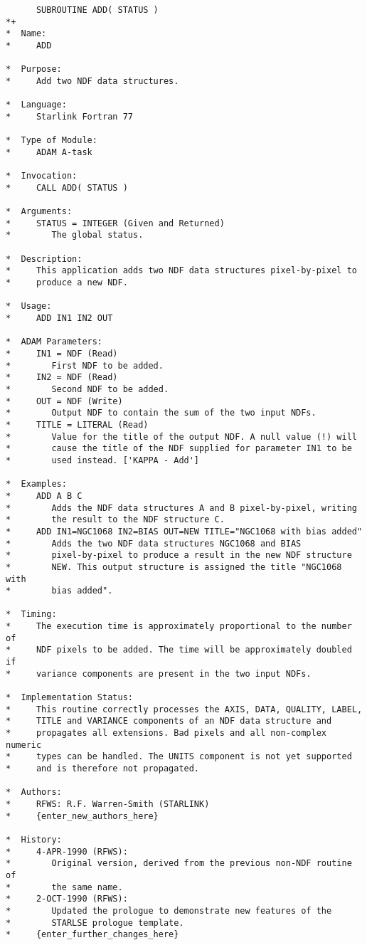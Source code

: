 \small
\begin{verbatim}
      SUBROUTINE ADD( STATUS )
*+
*  Name:
*     ADD

*  Purpose:
*     Add two NDF data structures.

*  Language:
*     Starlink Fortran 77

*  Type of Module:
*     ADAM A-task

*  Invocation:
*     CALL ADD( STATUS )

*  Arguments:
*     STATUS = INTEGER (Given and Returned)
*        The global status.

*  Description:
*     This application adds two NDF data structures pixel-by-pixel to
*     produce a new NDF.

*  Usage:
*     ADD IN1 IN2 OUT

*  ADAM Parameters:
*     IN1 = NDF (Read)
*        First NDF to be added.
*     IN2 = NDF (Read)
*        Second NDF to be added.
*     OUT = NDF (Write)
*        Output NDF to contain the sum of the two input NDFs.
*     TITLE = LITERAL (Read)
*        Value for the title of the output NDF. A null value (!) will
*        cause the title of the NDF supplied for parameter IN1 to be
*        used instead. ['KAPPA - Add']

*  Examples:
*     ADD A B C
*        Adds the NDF data structures A and B pixel-by-pixel, writing
*        the result to the NDF structure C.
*     ADD IN1=NGC1068 IN2=BIAS OUT=NEW TITLE="NGC1068 with bias added"
*        Adds the two NDF data structures NGC1068 and BIAS
*        pixel-by-pixel to produce a result in the new NDF structure
*        NEW. This output structure is assigned the title "NGC1068 with
*        bias added".

*  Timing:
*     The execution time is approximately proportional to the number of
*     NDF pixels to be added. The time will be approximately doubled if
*     variance components are present in the two input NDFs.

*  Implementation Status:
*     This routine correctly processes the AXIS, DATA, QUALITY, LABEL,
*     TITLE and VARIANCE components of an NDF data structure and
*     propagates all extensions. Bad pixels and all non-complex numeric
*     types can be handled. The UNITS component is not yet supported
*     and is therefore not propagated.

*  Authors:
*     RFWS: R.F. Warren-Smith (STARLINK)
*     {enter_new_authors_here}

*  History:
*     4-APR-1990 (RFWS):
*        Original version, derived from the previous non-NDF routine of
*        the same name.
*     2-OCT-1990 (RFWS):
*        Updated the prologue to demonstrate new features of the
*        STARLSE prologue template.
*     {enter_further_changes_here}


\end{verbatim}
